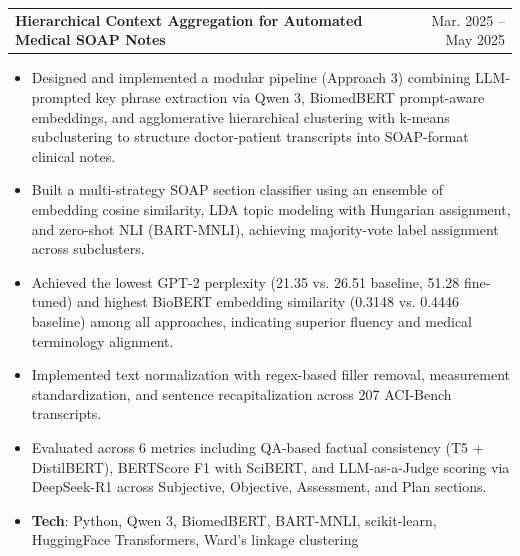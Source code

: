 \documentclass[letterpaper,11pt]{article}
\makeatletter
\newcommand{\resumeItem}[1]{
  \item\small{
    {#1 \vspace{-2pt}}
  }
}
\newcommand{\resumeProjectHeading}[2]{
    \item
    \begin{tabular*}{0.97\textwidth}{l@{\extracolsep{\fill}}r}
      \small#1 & #2 \\
    \end{tabular*}\vspace{-7pt}
}
\newcommand{\resumeItemListStart}{\begin{itemize}[noitemsep, topsep=0pt, parsep=0pt]}
\newcommand{\resumeItemListEnd}{\end{itemize}\vspace{-5pt}}
\makeatother
\begin{document}
  \resumeProjectHeading
    {\textbf{Hierarchical Context Aggregation for Automated Medical SOAP Notes}}{Mar. 2025 -- May 2025}
    \resumeItemListStart
      \resumeItem{Designed and implemented a modular pipeline (Approach 3) combining LLM-prompted key phrase extraction via Qwen 3, BiomedBERT prompt-aware embeddings, and agglomerative hierarchical clustering with k-means subclustering to structure doctor-patient transcripts into SOAP-format clinical notes.}
      \resumeItem{Built a multi-strategy SOAP section classifier using an ensemble of embedding cosine similarity, LDA topic modeling with Hungarian assignment, and zero-shot NLI (BART-MNLI), achieving majority-vote label assignment across subclusters.}
      \resumeItem{Achieved the lowest GPT-2 perplexity (21.35 vs. 26.51 baseline, 51.28 fine-tuned) and highest BioBERT embedding similarity (0.3148 vs. 0.4446 baseline) among all approaches, indicating superior fluency and medical terminology alignment.}
      \resumeItem{Implemented text normalization with regex-based filler removal, measurement standardization, and sentence recapitalization across 207 ACI-Bench transcripts.}
      \resumeItem{Evaluated across 6 metrics including QA-based factual consistency (T5 + DistilBERT), BERTScore F1 with SciBERT, and LLM-as-a-Judge scoring via DeepSeek-R1 across Subjective, Objective, Assessment, and Plan sections.}
      \resumeItem{\textbf{Tech}{: Python, Qwen 3, BiomedBERT, BART-MNLI, scikit-learn, HuggingFace Transformers, Ward's linkage clustering}}
    \resumeItemListEnd


\end{document}
